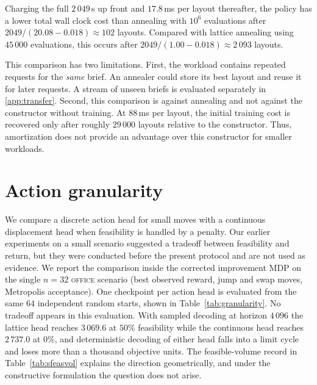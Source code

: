 \documentclass[11pt]{article}
\begin{document}
Charging the full $2\,049$\,s up front and $17.8$\,ms per layout thereafter,
the policy has a lower total wall clock cost than annealing with $10^{6}$
evaluations after $2049/(20.08-0.018)\approx102$ layouts. Compared with lattice
annealing using $45\,000$ evaluations, this occurs after
$2049/(1.00-0.018)\approx2\,093$ layouts.

This comparison has two limitations. First, the workload contains repeated
requests for the \emph{same} brief. An annealer could store its best layout and
reuse it for later requests. A stream of unseen briefs is evaluated separately
in \ref{app:transfer}. Second, this comparison is against annealing and not
against the constructor without training. At $88$\,ms per layout, the initial
training cost is recovered only after roughly $29\,000$ layouts relative to the
constructor. Thus, amortization does not provide an advantage over this
constructor for smaller workloads.

\section{Action granularity}
\label{app:granularity}
We compare a discrete action head for small moves with a continuous displacement
head when feasibility is handled by a penalty. Our earlier experiments on a
small scenario suggested a tradeoff between feasibility and return, but they
were conducted before the present protocol and are not used as evidence. We
report the comparison inside
the corrected improvement MDP on the single $n=32$ \textsc{office} scenario
(best observed reward, jump and swap moves, Metropolis acceptance). One checkpoint
per action head is evaluated from the same 64 independent random starts, shown in
Table~\ref{tab:granularity}. No tradeoff appears in this evaluation. With
sampled decoding at horizon $4\,096$ the lattice head reaches $3\,069.6$ at
$50\%$ feasibility while the continuous head reaches $2\,737.0$ at $0\%$, and
deterministic decoding of either head falls into a limit cycle and loses more
than a thousand objective units. The feasible-volume record in
Table~\ref{tab:sfeasvol} explains the direction geometrically, and under the constructive
formulation the question does not arise.
\end{document}
